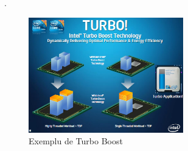 \cite{gelsinger2008intel}.

\begin{figure}[ht] \centering
\includegraphics[width=0.6\textwidth]{img/turbo.jpg}
\caption{Exemplu de Turbo Boost } \end{figure}


